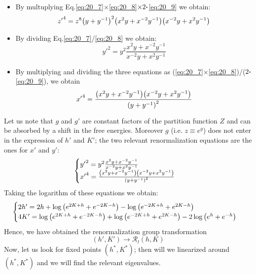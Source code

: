 \documentclass[../../Main/Main.tex]{subfiles}
\begin{document}
\begin{itemize}
\item By multuplying Eq.\eqref{eq:20_7}\( \times \)\eqref{eq:20_8}\( \times 2 \vdot   \)\eqref{eq:20_9} we obtain:
\begin{equation*}
  {z'}^4 = z^8 \qty( y + y^{-1})^2 \qty( x^2y + x^{-2}y^{-1}) \qty( x^{-2}y + x^2 y^{-1})
\end{equation*}
\item By dividing Eq.\eqref{eq:20_7}/\eqref{eq:20_8} we obtain:
\begin{equation*}
  {y'}^2 = y^2 \frac{x^2y + x^{-2}y^{-1}}{x^{-2}y+x^2y^{-1}}
\end{equation*}

\item By multiplying and dividing the three equations as (\eqref{eq:20_7}\( \times \)\eqref{eq:20_8})/(\( 2 \vdot \)\eqref{eq:20_9}), we obtain
\begin{equation*}
  {x'}^4 = \frac{\qty(x^2 y + x^{-2} y^{-1})\qty(x^{-2} y + x^2 y^{-1})  }{ \qty(y + y^{-1})^2 }
\end{equation*}

\end{itemize}

Let us note that \( g \) and \( g' \) are constant factors of the partition function \( Z \) and can be absorbed by a shift in the free energies.
Moreover \( g \) (i.e. \( z \equiv e^g \)) does not enter in the expression of \( h' \) and \( K' \); the two relevant renormalization equations are the ones for \( x' \) and \( y' \):
\begin{equation*}
  \begin{cases}
   {y'}^2 = y^2 \frac{x^2y + x^{-2}y^{-1}}{x^{-2}y+x^2y^{-1}} \\
   {x'}^4 = \frac{\qty(x^2 y + x^{-2} y^{-1})\qty(x^{-2} y + x^2 y^{-1})  }{ \qty(y + y^{-1})^2 }
  \end{cases}
\end{equation*}
Taking the logarithm of these equations we obtain:
\begin{equation}
  \begin{cases}
   2h' = 2h + \log{\qty(e^{2K+h} + e^{-2K-h}) } - \log{ \qty(e^{-2K+h} + e^{2K-h}) }  \\
  4K' = \log{ \qty(e^{2K+h}+ e^{-2K-h})} + \log{\qty(e^{-2K+h}+e^{2K-h})} - 2 \log{\qty(e^h + e^{-h})}
  \end{cases}
  \label{eq:20_10}
\end{equation}
Hence, we have obtained the renormalization group transformation
\begin{equation*}
  (h',K') \rightarrow \mathcal{R}_l (h,K)
\end{equation*}
Now, let us look for fixed points \( (h^*,K^*) \); then will we linearized around \( (h^*,K^*) \) and we will find the relevant eigenvalues.
\end{document}
